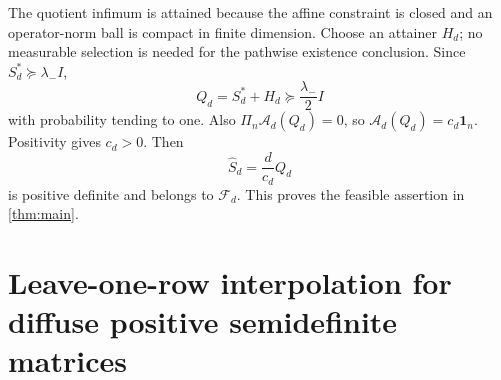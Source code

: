 \documentclass[11pt]{article}
\numberwithin{equation}{section}
\theoremstyle{definition}
\theoremstyle{remark}
\newcommand{\1}{\boldsymbol 1}
\newcommand{\PiZero}{\Pi_n}
\begin{document}
\begin{aiblock}
The quotient infimum is attained because the affine
constraint is closed and an operator-norm ball is compact
in finite dimension. Choose an attainer $H_d$; no
measurable selection is needed for the pathwise
existence conclusion. Since $S_d^*\succeq\lambda_-I$,
\[
  Q_d=S_d^*+H_d\succeq\frac{\lambda_-}2I
\]
with probability tending to one. Also
$\PiZero\mathcal{A}_d(Q_d)=0$, so
$\mathcal{A}_d(Q_d)=c_d\1_n$. Positivity gives $c_d>0$.
Then
\[
  \widehat S_d=\frac d{c_d}Q_d
\]
is positive definite and belongs to $\mathcal{F}_d$.
This proves the feasible assertion in \cref{thm:main}.

\end{aiblock}







\section{Leave-one-row interpolation for diffuse
  positive semidefinite
  matrices}\label{expert-leave-one-row-module}
\end{document}
